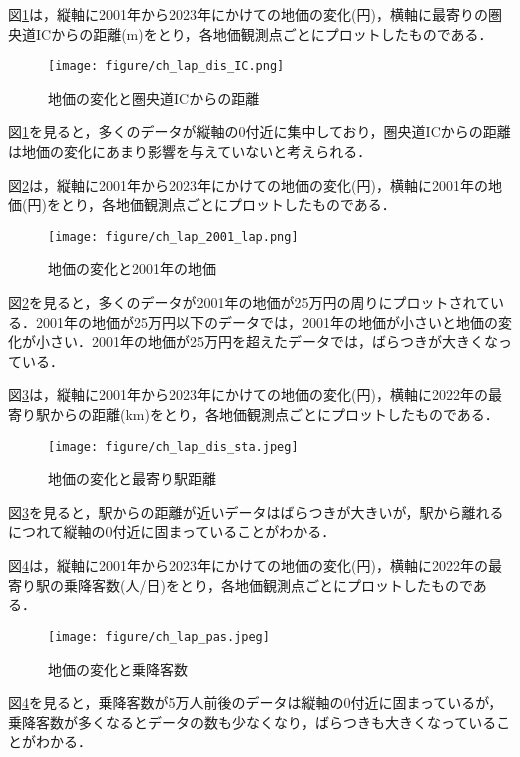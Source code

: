 図\ref{deruta_landprice disIC_m}は，縦軸に2001年から2023年にかけての地価の変化(円)，横軸に最寄りの圏央道ICからの距離(m)をとり，各地価観測点ごとにプロットしたものである．
\begin{figure}[H]
  \centering
  \texttt{[image: figure/ch\_lap\_dis\_IC.png]}
  \caption{地価の変化と圏央道ICからの距離}
  \label{deruta_landprice disIC_m}
\end{figure}
図\ref{deruta_landprice disIC_m}を見ると，多くのデータが縦軸の0付近に集中しており，圏央道ICからの距離は地価の変化にあまり影響を与えていないと考えられる．

図\ref{deruta_landprice_H13_landprice}は，縦軸に2001年から2023年にかけての地価の変化(円)，横軸に2001年の地価(円)をとり，各地価観測点ごとにプロットしたものである．
\begin{figure}[H]
  \centering
  \texttt{[image: figure/ch\_lap\_2001\_lap.png]}
  \caption{地価の変化と2001年の地価}
  \label{deruta_landprice_H13_landprice}
\end{figure}
図\ref{deruta_landprice_H13_landprice}を見ると，多くのデータが2001年の地価が25万円の周りにプロットされている．2001年の地価が25万円以下のデータでは，2001年の地価が小さいと地価の変化が小さい．2001年の地価が25万円を超えたデータでは，ばらつきが大きくなっている．

図\ref{deruta_landprice_dis_sta}は，縦軸に2001年から2023年にかけての地価の変化(円)，横軸に2022年の最寄り駅からの距離(km)をとり，各地価観測点ごとにプロットしたものである．
\begin{figure}[H]
  \centering
  \texttt{[image: figure/ch\_lap\_dis\_sta.jpeg]}
  \caption{地価の変化と最寄り駅距離}
  \label{deruta_landprice_dis_sta}
\end{figure}
図\ref{deruta_landprice_dis_sta}を見ると，駅からの距離が近いデータはばらつきが大きいが，駅から離れるにつれて縦軸の0付近に固まっていることがわかる．

図\ref{deruta_landprice_pas}は，縦軸に2001年から2023年にかけての地価の変化(円)，横軸に2022年の最寄り駅の乗降客数(人/日)をとり，各地価観測点ごとにプロットしたものである．
\begin{figure}[H]
  \centering
  \texttt{[image: figure/ch\_lap\_pas.jpeg]}
  \caption{地価の変化と乗降客数}
  \label{deruta_landprice_pas}
\end{figure}
図\ref{deruta_landprice_pas}を見ると，乗降客数が5万人前後のデータは縦軸の0付近に固まっているが，乗降客数が多くなるとデータの数も少なくなり，ばらつきも大きくなっていることがわかる．





